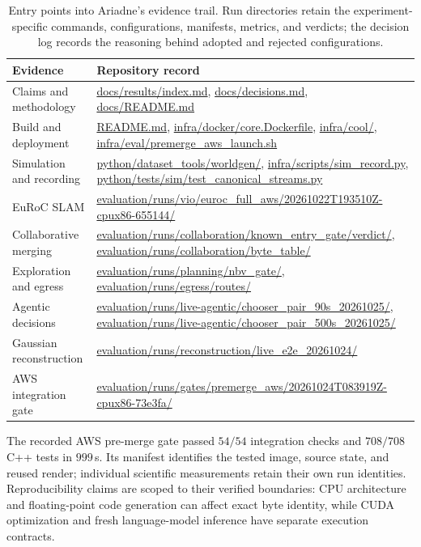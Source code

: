 \documentclass[10pt,a4paper]{article}
\renewcommand{\arraystretch}{1.12}
\newcommand{\ev}[1]{\url{#1}}
\begin{document}
\begin{table}[t]
\centering
\small
\setlength{\tabcolsep}{5pt}
\renewcommand{\arraystretch}{1.12}
\begin{tabular}{@{}P{3.0cm}P{12.4cm}@{}}
\toprule
\textbf{Evidence} & \textbf{Repository record} \\
\midrule
Claims and methodology &
\ev{docs/results/index.md},
\ev{docs/decisions.md},
\ev{docs/README.md} \\

Build and deployment &
\ev{README.md},
\ev{infra/docker/core.Dockerfile},
\ev{infra/cool/},
\ev{infra/eval/premerge_aws_launch.sh} \\

Simulation and recording &
\ev{python/dataset_tools/worldgen/},
\ev{infra/scripts/sim_record.py},
\ev{python/tests/sim/test_canonical_streams.py} \\

EuRoC SLAM &
\ev{evaluation/runs/vio/euroc_full_aws/20261022T193510Z-cpux86-655144/} \\

Collaborative merging &
\ev{evaluation/runs/collaboration/known_entry_gate/verdict/},
\ev{evaluation/runs/collaboration/byte_table/} \\

Exploration and egress &
\ev{evaluation/runs/planning/nbv_gate/},
\ev{evaluation/runs/egress/routes/} \\

Agentic decisions &
\ev{evaluation/runs/live-agentic/chooser_pair_90s_20261025/},
\ev{evaluation/runs/live-agentic/chooser_pair_500s_20261025/} \\

Gaussian reconstruction &
\ev{evaluation/runs/reconstruction/live_e2e_20261024/} \\

AWS integration gate &
\ev{evaluation/runs/gates/premerge_aws/20261024T083919Z-cpux86-73e3fa/} \\
\bottomrule
\end{tabular}
\caption{Entry points into Ariadne's evidence trail.
Run directories retain the experiment-specific commands,
configurations, manifests, metrics, and verdicts; the
decision log records the reasoning behind adopted and
rejected configurations.}
\label{tab:evidence-index}
\end{table}

The recorded AWS pre-merge gate passed \textbf{$54/54$}
integration checks and \textbf{$708/708$} C++ tests in
$999$\,s. Its manifest identifies the tested image,
source state, and reused render; individual scientific
measurements retain their own run identities.
Reproducibility claims are scoped to their verified
boundaries: CPU architecture and floating-point code
generation can affect exact byte identity, while CUDA
optimization and fresh language-model inference have
separate execution contracts.
\end{document}
